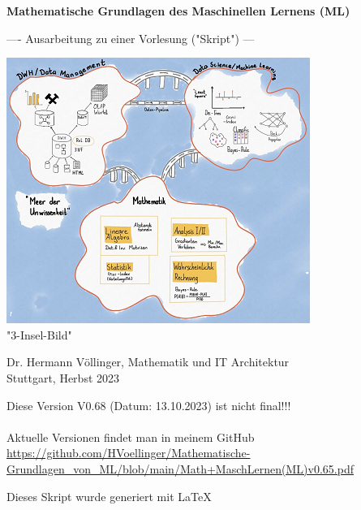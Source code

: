 \documentclass[12pt]{article}
\begin{document}

\begin{titlepage}
   \begin{center}
   \LARGE  
   \vspace{1.0cm}
       
   \textbf{Mathematische Grundlagen des Maschinellen Lernens (ML)}

   \vspace{1.0cm}
  
   \large       
   ---- Ausarbeitung zu einer Vorlesung ("Skript") ---
       
   
   \vspace{1.0cm}
   
   \includegraphics{DWH-Zeichnung}\\
   \small "3-Insel-Bild"  
       
   \vfill
   \large   
   
   Dr. Hermann Völlinger, Mathematik und IT Architektur
           \\ Stuttgart, Herbst 2023     

   \vspace{0.6cm}
        
   \end{center}
   
\begin{center}
Diese Version V0.68 (Datum: 13.10.2023) ist nicht final!!! \\
{\color{red}{(Beachte: ************ Kommentare *********)}} \\[0.3cm]
Aktuelle Versionen findet man in meinem GitHub\\[0.1cm]
\url{https://github.com/HVoellinger/Mathematische-Grundlagen_von_ML/blob/main/Math+MaschLernen(ML)v0.65.pdf} \\
\vspace{0.4cm}
\begin{large}
Dieses Skript wurde generiert mit \LaTeX\  
\end{large}
\end{center}


\end{titlepage}
\end{document}
